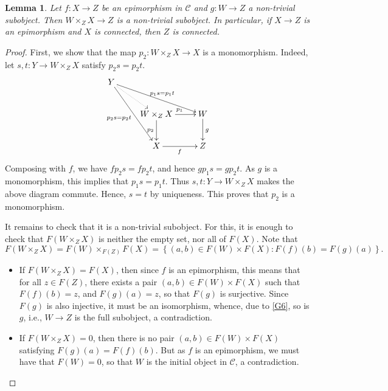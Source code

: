 \documentclass[10pt]{article}
\theoremstyle{thmstyle}
\newtheorem{lemma}[theorem]{Lemma}
\theoremstyle{defstyle}
\newcommand{\scrC}{\mathscr{C}} %
\begin{document}
\begin{lemma}
    Let $f: X\to Z$ be an epimorphism in $\scrC$ and $g: W\to Z$ a non-trivial subobject. Then $W\times_Z X\to Z$ is a non-trivial subobject. In particular, if $X\to Z$ is an epimorphism and $X$ is connected, then $Z$ is connected.
\end{lemma}
\begin{proof}
    First, we show that the map $p_2: W\times_Z X\to X$ is a monomorphism. Indeed, let $s, t: Y\to W\times_Z X$ satisfy $p_2 s = p_2 t$.
    \begin{equation*}
        \xymatrix {
            Y\ar@{.>}[rd]\ar[rrd]^{p_1s = p_1 t}\ar[rdd]_{p_2s = p_2t} & & \\
            & W\times_Z X\ar[r]^{p_1}\ar[d]_{p_2} & W\ar[d]^g\\
            & X\ar[r]_f & Z
        }
    \end{equation*}
    Composing with $f$, we have $fp_2s = fp_2t$, and hence $gp_1s = gp_2t$. As $g$ is a monomorphism, this implies that $p_1s = p_1t$. Thus $s,t: Y\to W\times_Z X$ makes the above diagram commute. Hence, $s = t$ by uniqueness. This proves that $p_2$ is a monomorphism. 

    It remains to check that it is a non-trivial subobject. For this, it is enough to check that $F(W\times_Z X)$ is neither the empty set, nor all of $F(X)$. Note that 
    \begin{equation*}
        F(W\times_Z X) = F(W)\times_{F(Z)} F(X) = \left\{(a, b)\in F(W)\times F(X)\colon F(f)(b) = F(g)(a)\right\}.
    \end{equation*}
    \begin{itemize}
        \item If $F(W\times_Z X) = F(X)$, then since $f$ is an epimorphism, this means that for all $z\in F(Z)$, there exists a pair $(a, b)\in F(W)\times F(X)$ such that $F(f)(b) = z$, and $F(g)(a) = z$, so that $F(g)$ is surjective. Since $F(g)$ is also injective, it must be an isomorphism, whence, due to \ref{G6}, so is $g$, i.e., $W\to Z$ is the full subobject, a contradiction. 
        
        \item If $F(W\times_Z X) = 0$, then there is no pair $(a, b)\in F(W)\times F(X)$ satisfying $F(g)(a) = F(f)(b)$. But as $f$ is an epimorphism, we must have that $F(W) = 0$, so that $W$ is the initial object in $\scrC$, a contradiction. \qedhere
    \end{itemize}
\end{proof}
\end{document}
